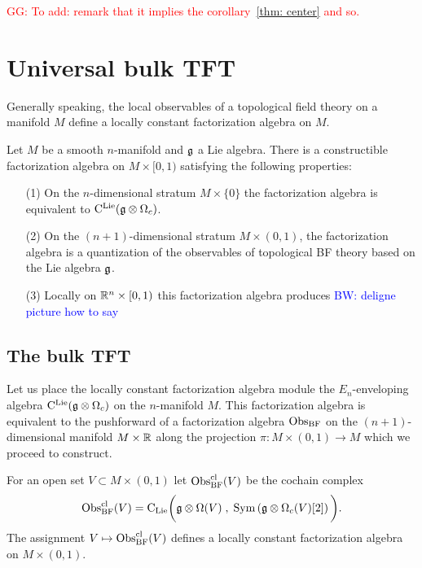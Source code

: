 \documentclass[11pt]{amsart}
\numberwithin{equation}{section}
\def\brian{\textcolor{blue}{BW: }\textcolor{blue}}
\def\greg{\textcolor{red}{GG: }\textcolor{red}}
\begin{document}
\greg{To add: remark that it implies the corollary~\ref{thm: center} and so.}

\section{Universal bulk TFT}
\label{sec: TFT}

Generally speaking, the local observables of a topological field theory on a manifold $M$ define a locally constant factorization algebra on $M$. 

\begin{thm}
Let $M$ be a smooth $n$-manifold and $\mathfrak g$ a Lie algebra. 
There is a constructible factorization algebra on $M \times [0,1)$ satisfying the following properties:
\begin{itemize}
\item[(1)] On the $n$-dimensional stratum $M \times \{0\}$ the factorization algebra is equivalent to ${\rm C}^{\rm Lie} (\mathfrak g \otimes \Omega_c)$.
\item[(2)] On the $(n+1)$-dimensional stratum $M \times (0,1)$, the factorization algebra is a quantization of the observables of topological BF theory based on the Lie algebra $\mathfrak g$.
\item[(3)] Locally on $\mathbb R^n \times [0,1)$ this factorization algebra produces \brian{deligne picture how to say}
\end{itemize}
\end{thm}


\subsection{The bulk TFT}

Let us place the locally constant factorization algebra module the $E_n$-enveloping algebra ${\rm C}^{\rm Lie}(\mathfrak g \otimes \Omega_c)$ on the $n$-manifold $M$.
This factorization algebra is equivalent to the pushforward of a factorization algebra ${\rm Obs}_{\rm BF}$ on the $(n+1)$-dimensional manifold $M \times \mathbb R$ along the projection $\pi : M \times (0,1) \to M$ which we proceed to construct. 

\begin{dfn}
For an open set $V \subset M \times (0,1)$ let ${\rm Obs}^{\rm cl}_{\rm BF} (V)$ be the cochain complex 
\[
{\rm Obs}^{\rm cl}_{\rm BF} (V) = {\rm C}_{{\rm Lie}} \bigg(\mathfrak g \otimes \Omega (V) \; , \; {\rm Sym} \left(\mathfrak g \otimes \Omega_c(V) [2] \right) \bigg) .
\]
The assignment $V \mapsto {\rm Obs}^{\rm cl}_{\rm BF}(V)$ defines a locally constant factorization algebra on $M \times (0,1)$. 
\end{dfn}
\end{document}
